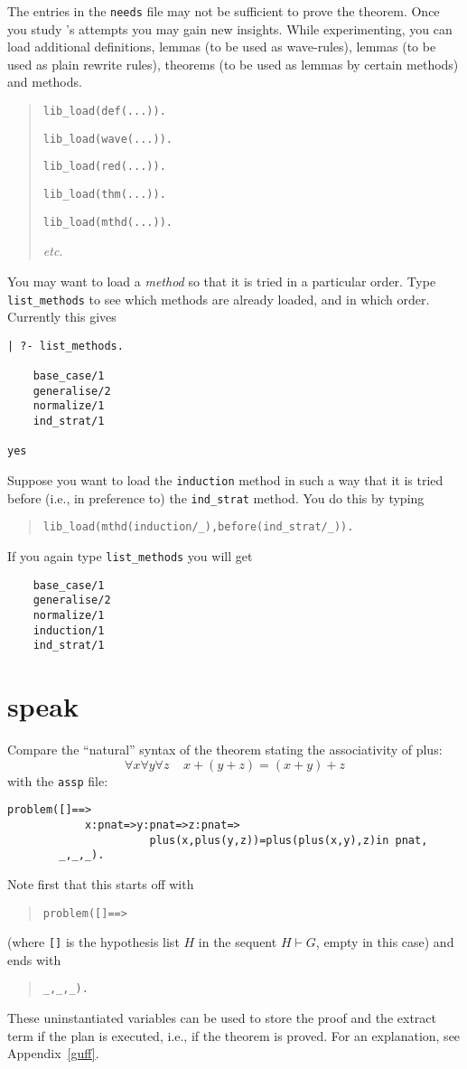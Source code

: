 \documentclass{article}
\begin{document}
The entries in the {\tt needs} file may not be sufficient to prove the
theorem. Once you study \clam's attempts you may gain new insights.
While experimenting, you can load additional definitions, lemmas (to
be used as wave-rules), lemmas (to be used as plain rewrite rules),
theorems (to be used as lemmas by certain methods) and methods.
%
\begin{verse}
{\tt lib\_load(def(...)).}

{\tt lib\_load(wave(...)).}

{\tt lib\_load(red(...)).}

{\tt lib\_load(thm(...)).}

{\tt lib\_load(mthd(...)).}

{\em etc.} 
\end{verse}
%
You may want to load a {\em method} so that it is tried in a particular order.
Type {\tt list\_methods} to see which methods are already loaded, and in which
order. Currently this gives
%
\begin{verbatim}
| ?- list_methods.

    base_case/1
    generalise/2
    normalize/1
    ind_strat/1

yes
\end{verbatim}
%
Suppose you want to load the {\tt induction} method in such a way that it is
tried before (i.e., in preference to) the {\tt ind\_strat} method.
You do this by typing
%
\begin{verse}
{\tt lib\_load(mthd(induction/\_),before(ind\_strat/\_)).}
\end{verse}
%
If you again type {\tt list\_methods} you will get
%
\begin{verbatim}
    base_case/1
    generalise/2
    normalize/1
    induction/1
    ind_strat/1
\end{verbatim}

\section{\oyster speak\label{def-syntax}}

Compare the ``natural'' syntax of the theorem stating the associativity
of plus:
%
\[ \forall x \forall y \forall z \; \; \; \; x + (y + z) = (x + y) + z \]
%
with the {\tt assp} file:
%
\begin{verbatim}
problem([]==>
            x:pnat=>y:pnat=>z:pnat=>
                      plus(x,plus(y,z))=plus(plus(x,y),z)in pnat,
        _,_,_).
\end{verbatim}
%
Note first that this starts off with
%
\begin{verse}
{\tt problem([]==>}
\end{verse}
%
(where {\tt []} is the hypothesis list $H$ in the sequent $H \vdash G$, empty
in this case) and ends with
%
\begin{verse}
{\tt \_,\_,\_).}
\end{verse}
%
These uninstantiated variables can be used to store the proof and the
extract term if the plan is executed, i.e., if the theorem is proved.
For an explanation, see Appendix~\ref{guff}.
\end{document}
